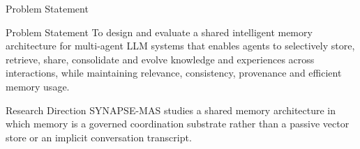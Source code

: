 \begin{frame}{Problem Statement}
\begin{exampleblock}{Problem Statement}
To design and evaluate a shared intelligent memory architecture for multi-agent LLM systems that enables agents to selectively store, retrieve, share, consolidate and evolve knowledge and experiences across interactions, while maintaining relevance, consistency, provenance and efficient memory usage.
\end{exampleblock}
\vspace{4mm}
\begin{block}{Research Direction}
SYNAPSE-MAS studies a shared memory architecture in which memory is a governed coordination substrate rather than a passive vector store or an implicit conversation transcript.
\end{block}
\end{frame}
